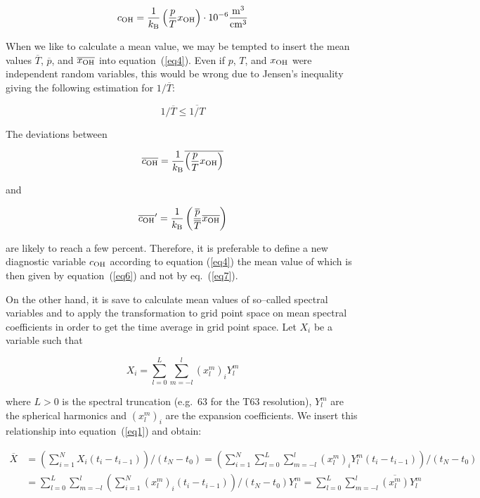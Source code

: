 \begin{appendix}
\begin{equation}\label{eq4}
c_{\rm OH}=\frac{1}{k_{\rm B}}\left(\frac{p}{T}x_{\rm OH}\right)\cdot
10^{-6}\frac{{\rm m}^3}{{\rm cm}^3}
\end{equation}

When we like to calculate a mean value, we may be tempted to insert the mean
values $\overline{T}$, $\overline{p}$, and $\overline{x_{\rm OH}}$ into 
equation~(\ref{eq4}). 
Even if $p$, $T$, and
$x_{\rm OH}$ were independent random variables, this would be wrong due to 
Jensen's inequality giving the following estimation for $1/\overline{T}$:

\begin{equation}\label{eq5}
1/\overline{T} \le \overline{1/T}
\end{equation}

The deviations between 

\begin{equation}\label{eq6}
\overline{c_{\rm OH}}=\frac{1}{k_{\rm B}}
\overline{\left(\frac{p}{T}x_{\rm OH}\right)}
\end{equation}

and 

\begin{equation}\label{eq7}
\overline{c_{\rm OH}}'=\frac{1}{k_{\rm B}}
\left(\frac{\overline{p}}{\overline{T}}\overline{x_{\rm OH}}\right)
\end{equation}

are likely to reach a few percent. Therefore, it is preferable to define a
new diagnostic variable $c_{\rm OH}$ according to equation (\ref{eq4})
the mean value of which is then 
given by equation~(\ref{eq6}) and not by eq.~(\ref{eq7}).

On the other hand, it is save to calculate mean values of so--called
spectral variables and to apply the transformation to grid point space
on mean spectral coefficients in order to get the time average in grid
point space. Let $X_i$ be a variable such that

\begin{equation}\label{eqspectralexpansion}
X_i=\sum\limits_{l=0}^L\sum\limits_{m=-l}^l (x_l^m)_iY_l^m
\end{equation}

where $L>0$ is the spectral truncation (e.g.~63 for the T63
resolution), $Y_l^m$ are the spherical harmonics and $(x_l^m)_i$ are
the expansion coefficients. We insert this relationship into
equation~(\ref{eq1}) and obtain:

\begin{equation}\begin{split}
\overline{X}&=
\left(\sum\limits_{i=1}^NX_i\left(t_i-t_{i-1}\right)\right)/\left(t_N-t_0\right)
=\left(\sum\limits_{i=1}^N  \sum\limits_{l=0}^L\sum\limits_{m=-l}^l (x_l^m)_iY_l^m
\left(t_i-t_{i-1}\right)\right)/\left(t_N-t_0\right)\\
&=\sum\limits_{l=0}^L\sum\limits_{m=-l}^l\left(\sum\limits_{i=1}^N (x_l^m)_i
\left(t_i-t_{i-1}\right)\right)/\left(t_N-t_0\right)Y_l^m
=\sum\limits_{l=0}^L\sum\limits_{m=-l}^l\overline{(x_l^m)}Y_l^m
\end{split}\end{equation}


\end{appendix}
